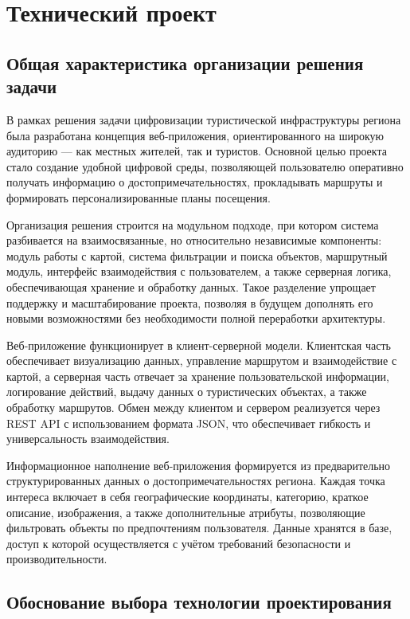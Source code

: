 \section{Технический проект}
\subsection{Общая характеристика организации решения задачи}

В рамках решения задачи цифровизации туристической инфраструктуры региона была разработана концепция веб-приложения, ориентированного на широкую аудиторию — как местных жителей, так и туристов. Основной целью проекта стало создание удобной цифровой среды, позволяющей пользователю оперативно получать информацию о достопримечательностях, прокладывать маршруты и формировать персонализированные планы посещения.

Организация решения строится на модульном подходе\cite{b12}, при котором система разбивается на взаимосвязанные, но относительно независимые компоненты: модуль работы с картой, система фильтрации и поиска объектов, маршрутный модуль, интерфейс взаимодействия с пользователем, а также серверная логика, обеспечивающая хранение и обработку данных. Такое разделение упрощает поддержку и масштабирование проекта, позволяя в будущем дополнять его новыми возможностями без необходимости полной переработки архитектуры.

Веб-приложение функционирует в клиент-серверной модели\cite{b13}. Клиентская часть обеспечивает визуализацию данных, управление маршрутом и взаимодействие с картой, а серверная часть отвечает за хранение пользовательской информации, логирование действий, выдачу данных о туристических объектах, а также обработку маршрутов. Обмен между клиентом и сервером реализуется через REST API с использованием формата JSON, что обеспечивает гибкость и универсальность взаимодействия.

Информационное наполнение веб-приложения формируется из предварительно структурированных данных о достопримечательностях региона. Каждая точка интереса включает в себя географические координаты, категорию, краткое описание, изображения, а также дополнительные атрибуты, позволяющие фильтровать объекты по предпочтениям пользователя. Данные хранятся в базе, доступ к которой осуществляется с учётом требований безопасности и производительности.

\subsection{Обоснование выбора технологии проектирования}

